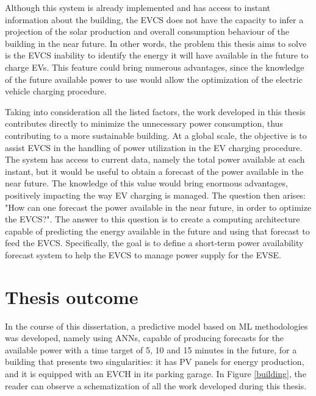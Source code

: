 Although this system is already implemented and has access to instant information about the building, the \ac{EVCS} does not have the capacity to infer a projection of the solar production and overall consumption behaviour of the building in the near future. In other words, the problem this thesis aims to solve is the \ac{EVCS} inability to identify the energy it will have available in the future to charge \ac{EV}s. This feature could bring numerous advantages, since the knowledge of the future available power to use would allow the optimization of the electric vehicle charging procedure.


Taking into consideration all the listed factors, the work developed in this thesis contributes directly to minimize the unnecessary power consumption, thus contributing to a more sustainable building. At a global scale, the objective is to assist \ac{EVCS} in the handling of power utilization in the \ac{EV} charging procedure. The system has access to current data, namely the total power available at each instant, but it would be useful to obtain a forecast of the power available in the near future. The knowledge of this value would bring enormous advantages, positively impacting the way \ac{EV} charging is managed. The question then arises: "How can one forecast the power available in the near future, in order to optimize the \ac{EVCS}?". The answer to this question is to create a computing architecture capable of predicting the energy available in the future and using that forecast to feed the \ac{EVCS}. Specifically, the goal is to define a short-term power availability forecast system to help the \ac{EVCS} to manage power supply for the \ac{EVSE}. 





\section{Thesis outcome}

In the course of this dissertation, a predictive model based on \ac{ML} methodologies was developed, namely using \ac{ANNs}, capable of producing forecasts for the available power with a time target of 5, 10 and 15 minutes in the future, for a building that presents two singularities: it has \ac{PV} panels for energy production, and it is equipped with an \ac{EVCH} in its parking garage. In Figure \ref{building}, the reader can observe a schematization of all the work developed during this thesis. 

